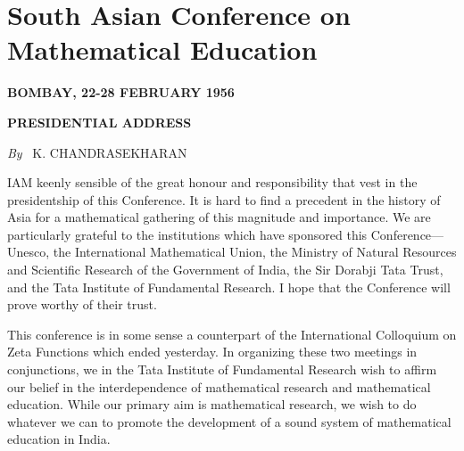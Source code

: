 \chapter{South Asian Conference on Mathematical Education}

\begin{center}
{\bf BOMBAY, 22-28 FEBRUARY 1956}
\medskip

{\bf PRESIDENTIAL ADDRESS}
\medskip

{{\em By}~ K. CHANDRASEKHARAN}
\end{center}

\setcounter{pageoriginal}{22}
I\pageoriginale AM keenly sensible of the great honour and responsibility that vest in the presidentship of this Conference. It is hard to find a precedent in the history of Asia for a mathematical gathering of this magnitude and importance. We are particularly grateful to the institutions which have sponsored this Conference---Unesco, the International Mathematical Union, the Ministry of Natural Resources and Scientific Research of the Government of India, the Sir Dorabji Tata Trust, and the Tata Institute of Fundamental Research. I hope that the Conference will prove worthy of their trust.

This conference is in some sense a counterpart of the International Colloquium on Zeta Functions which ended yesterday. In organizing these two meetings in conjunctions, we in the Tata Institute of Fundamental Research wish to affirm our belief in the interdependence of mathematical research and mathematical education. While our primary aim is mathematical research, we wish to do whatever we can to promote the development of a sound system of mathematical education in India.

